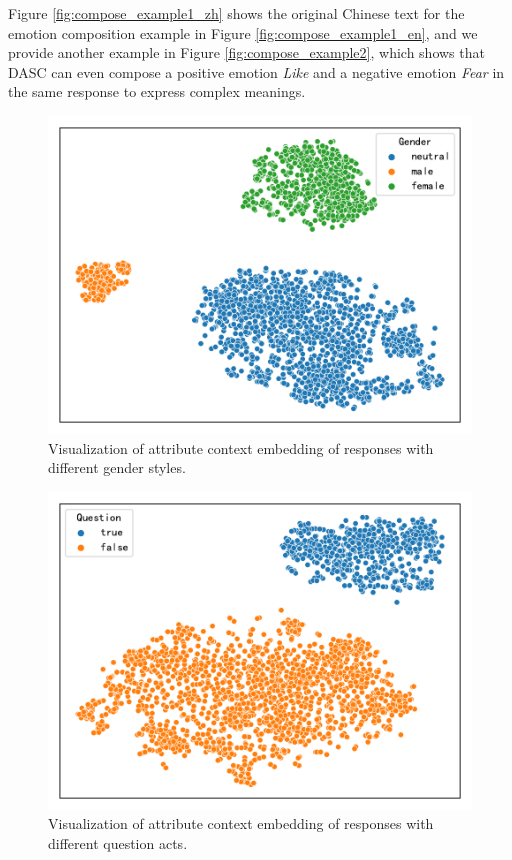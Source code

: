 Figure \ref{fig:compose_example1_zh} shows the original Chinese text for the emotion composition example in Figure \ref{fig:compose_example1_en}, and we provide another example in Figure \ref{fig:compose_example2}, which shows that DASC can even compose a positive emotion \textit{Like} and a negative emotion \textit{Fear} in the same response to express complex meanings. 

\begin{figure}[ht]
    \centering
    \includegraphics[width=1.0\columnwidth]{figures/gender_context_emb.pdf}
    \caption{Visualization of attribute context embedding of responses with different gender styles.}
    \label{fig:gender_context_emb}
\end{figure}

\begin{figure}[ht]
    \centering
    \includegraphics[width=1.0\columnwidth]{figures/question_context_emb.pdf}
    \caption{Visualization of attribute context embedding of responses with different question acts.}
    \label{fig:question_context_emb}
\end{figure}

